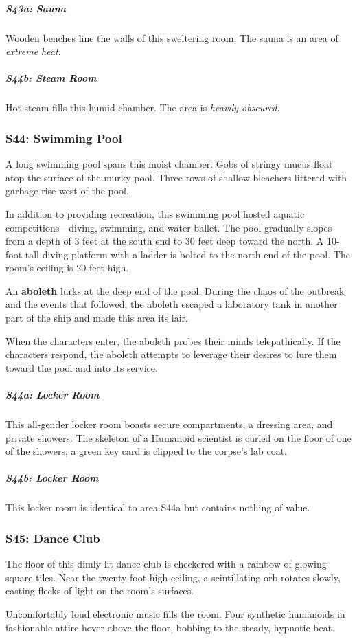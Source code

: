 \documentclass[10pt,a4paper,twoside,bg=print,twocolumn,openany,nodeprecatedcode]{dndbook}
\begin{document}
\subparagraph{S43a: Sauna}
Wooden benches line the walls of this sweltering room. The sauna is an area of \textit{extreme heat}.

\subparagraph{S44b: Steam Room}
Hot steam fills this humid chamber. The area is \textit{heavily obscured}.

\subsubsection{S44: Swimming Pool}
\begin{DndReadAloud}{}
A long swimming pool spans this moist chamber. Gobs of stringy mucus float atop the surface of the murky pool. Three rows of shallow bleachers littered with garbage rise west of the pool.

\end{DndReadAloud}

In addition to providing recreation, this swimming pool hosted aquatic competitions—diving, swimming, and water ballet. The pool gradually slopes from a depth of 3 feet at the south end to 30 feet deep toward the north. A 10-foot-tall diving platform with a ladder is bolted to the north end of the pool. The room's ceiling is 20 feet high.

An \textbf{aboleth} lurks at the deep end of the pool. During the chaos of the outbreak and the events that followed, the aboleth escaped a laboratory tank in another part of the ship and made this area its lair.

When the characters enter, the aboleth probes their minds telepathically. If the characters respond, the aboleth attempts to leverage their desires to lure them toward the pool and into its service.

\subparagraph{S44a: Locker Room}
This all-gender locker room boasts secure compartments, a dressing area, and private showers. The skeleton of a Humanoid scientist is curled on the floor of one of the showers; a green key card is clipped to the corpse's lab coat.

\subparagraph{S44b: Locker Room}
This locker room is identical to area S44a but contains nothing of value.

\subsubsection{S45: Dance Club}
\begin{DndReadAloud}{}
The floor of this dimly lit dance club is checkered with a rainbow of glowing square tiles. Near the twenty-foot-high ceiling, a scintillating orb rotates slowly, casting flecks of light on the room's surfaces.

Uncomfortably loud electronic music fills the room. Four synthetic humanoids in fashionable attire hover above the floor, bobbing to the steady, hypnotic beat.

\end{DndReadAloud}
\end{document}
